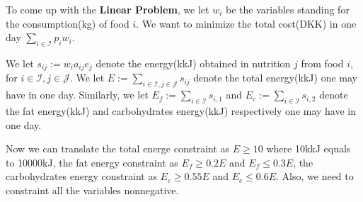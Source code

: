 \documentclass[10pt]{article}
\begin{document}
To come up with the \textbf{Linear Problem}, 
we let $w_i$ be the variables standing for the consumption(kg) of food $i$.
We want to minimize the total cost(DKK) in one day 
$\sum_{i\in\mathcal{I}}p_iw_i$.

We let $s_{ij}:=w_ia_{ij}e_j$ 
denote the energy(kkJ) obtained in nutrition $j$ from food $i$,
for $i\in\mathcal{I},j\in\mathcal{J}$.
We let $E:=\sum_{i\in\mathcal{I},j\in\mathcal{J}}s_{ij}$ 
denote the total energy(kkJ) one may have in one day. 
Similarly, we let $E_f:=\sum_{i\in\mathcal{I}}s_{i,1}$
and $E_c:=\sum_{i\in\mathcal{I}}s_{i,2}$
denote the fat energy(kkJ) and carbohydrates energy(kkJ) respectively one may have in one day.

Now we can translate the total energe constraint as $E\geq10$ 
where 10kkJ equals to 10000kJ,
the fat energy constraint as $E_f\geq0.2E$ and $E_f\leq0.3E$,
the carbohydrates energy constraint as $E_c\geq0.55E$ and $E_c\leq0.6E$.
Also, we need to constraint all the variables nonnegative.
\end{document}
